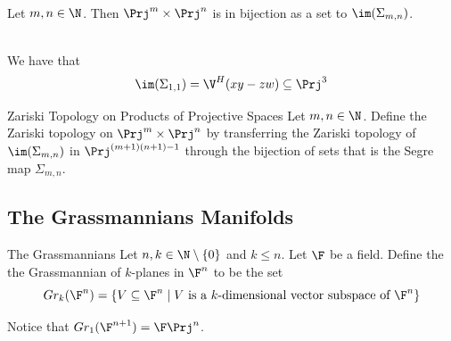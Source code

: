 \documentclass[a4paper]{article}
\begin{document}
\begin{prp}{}{}\\
Let $m,n\in\N$. Then $\Prj^m\times\Prj^n$ is in bijection as a set to $\im(\Sigma_{m,n})$. 
\end{prp}

\begin{eg}{}{}\\
We have that $$\im(\Sigma_{1,1})=\V^H(xy-zw)\subseteq\Prj^3$$
\end{eg}

\begin{defn}{Zariski Topology on Products of Projective Spaces}{} Let $m,n\in\N$. Define the Zariski topology on $\Prj^m\times\Prj^n$ by transferring the Zariski topology of $\im(\Sigma_{m,n})$ in $\Prj^{(m+1)(n+1)-1}$ through the bijection of sets that is the Segre map $\Sigma_{m,n}$. 
\end{defn}

\subsection{The Grassmannians Manifolds}
\begin{defn}{The Grassmannians}{} Let $n,k\in\N\setminus\{0\}$ and $k\leq n$. Let $\F$ be a field. Define the the Grassmannian of $k$-planes in $\F^n$ to be the set $$ Gr_k(\F^n)=\{V\subseteq\F^n\;|\;V\text{ is a }k\text{-dimensional vector subspace of }\F^n\}$$
\end{defn}

Notice that $ Gr_1(\F^{n+1})=\F\Prj^n$. 
\end{document}
